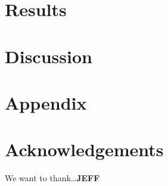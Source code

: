 \documentclass[submit]{smj}
\begin{document}
\section{Results}

\section{Discussion}

\section{Appendix}
\section*{Acknowledgements}
We want to thank\ldots \textbf{JEFF}



\end{document}
